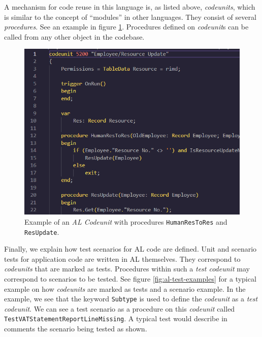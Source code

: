 \documentclass{article}
\begin{document}
A mechanism for code reuse in this language is, as listed above, \emph{codeunits}, which is similar to the concept of ``modules'' in other languages. They consist of several \emph{procedures}. See an example in figure \ref{fig:codeunit-example}. Procedures defined on \emph{codeunit}s can be called from any other object in the codebase.
\begin{figure}[H]
  \includegraphics[width=\textwidth]{images/alcodeunit.png}
  \caption{Example of an \emph{AL Codeunit} with procedures \texttt{HumanResToRes} and \texttt{ResUpdate}.}
  \label{fig:codeunit-example}
\end{figure}

Finally, we explain how test scenarios for AL code are defined. Unit and scenario tests for application code are written in AL themselves. They correspond to \emph{codeunits} that are marked as tests. Procedures within such a \emph{test codeunit} may correspond to scenarios to be tested. See figure \ref{fig:al-test-examples} for a typical example on how \emph{codeunits} are marked as tests and a scenario example. In the example, we see that the keyword \texttt{Subtype} is used to define the \emph{codeunit} as a \emph{test codeunit}. We can see a test scenario as a procedure on this \emph{codeunit} called \texttt{TestVATStatementReportLineMissing}. A typical test would describe in comments the scenario being tested as shown.
\end{document}
